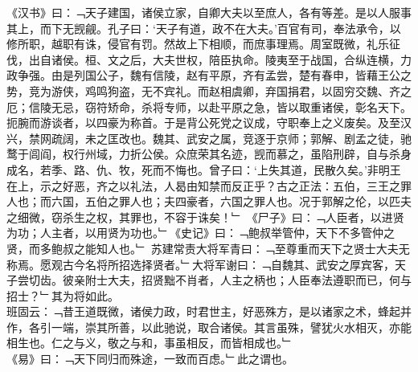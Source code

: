 《汉书》曰：﹁天子建国，诸侯立家，自卿大夫以至庶人，各有等差。是以人服事其上，而下无觊觎。孔子曰：‘天子有道，政不在大夫。’百官有司，奉法承令，以修所职，越职有诛，侵官有罚。然故上下相顺，而庶事理焉。周室既微，礼乐征伐，出自诸侯。桓、文之后，大夫世权，陪臣执命。陵夷至于战国，合纵连横，力政争强。由是列国公子，魏有信陵，赵有平原，齐有孟尝，楚有春申，皆藉王公之势，竞为游侠，鸡鸣狗盗，无不宾礼。而赵相虞卿，弃国捐君，以固穷交魏、齐之厄；信陵无忌，窃符矫命，杀将专师，以赴平原之急，皆以取重诸侯，彰名天下。扼腕而游谈者，以四豪为称首。于是背公死党之议成，守职奉上之义废矣。及至汉兴，禁网疏阔，未之匡改也。魏其、武安之属，竞逐于京师；郭解、剧孟之徒，驰鹜于闾阎，权行州域，力折公侯。众庶荣其名迹，觊而慕之，虽陷刑辟，自与杀身成名，若季、路、仇、牧，死而不悔也。曾子曰：‘上失其道，民散久矣。’非明王在上，示之好恶，齐之以礼法，人曷由知禁而反正乎？古之正法：五伯，三王之罪人也；而六国，五伯之罪人也；夫四豪者，六国之罪人也。况于郭解之伦，以匹夫之细微，窃杀生之权，其罪也，不容于诛矣！﹂
《尸子》曰：﹁人臣者，以进贤为功；人主者，以用贤为功也。﹂《史记》曰：﹁鲍叔举管仲，天下不多管仲之贤，而多鲍叔之能知人也。﹂
苏建常责大将军青曰：﹁至尊重而天下之贤士大夫无称焉。愿观古今名将所招选择贤者。﹂大将军谢曰：﹁自魏其、武安之厚宾客，天子尝切齿。彼亲附士大夫，招贤黜不肖者，人主之柄也；人臣奉法遵职而已，何与招士？﹂其为将如此。
\\
班固云：﹁昔王道既微，诸侯力政，时君世主，好恶殊方，是以诸家之术，蜂起并作，各引一端，崇其所善，以此驰说，取合诸侯。其言虽殊，譬犹火水相灭，亦能相生也。仁之与义，敬之与和，事虽相反，而皆相成也。﹂\\
《易》曰：﹁天下同归而殊途，一致而百虑。﹂此之谓也。
%
%
